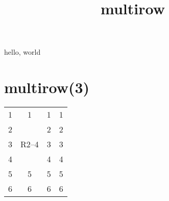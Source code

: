 \documentclass{amsart}
\title{multirow}
\begin{document}
\maketitle

hello, world

\section*{multirow(3)}

\begin{tabular}{cccc}
1 & 1                  & 1 & 1\\
2 & \multirow{3}{*}{R2--4} & 2 & 2\\
3 &                    & 3 & 3\\
4 &                    & 4 & 4\\
5 & 5                  & 5 & 5\\
6 & 6                  & 6 & 6
\end{tabular}

\bigskip
\bigskip

\ifx\TeXMLrowspan\undefined
\end{document}
